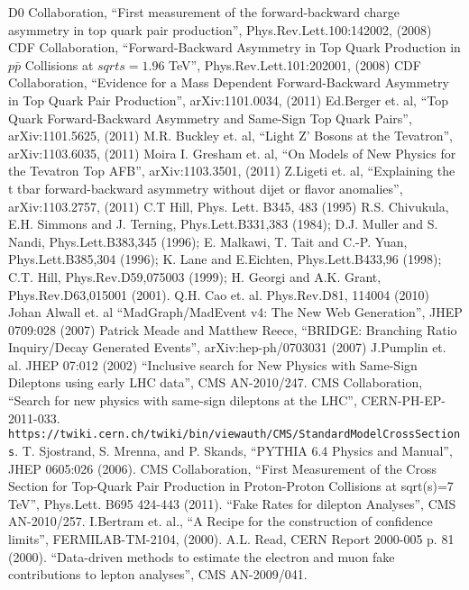 \begin{thebibliography}{99}

 {D0 Collaboration, ``First measurement of the forward-backward charge asymmetry in top quark pair production'', Phys.Rev.Lett.100:142002, (2008)}
 {CDF Collaboration, ``Forward-Backward Asymmetry in Top Quark Production in $p\bar{p}$ Collisions at $sqrt{s}=1.96$ TeV'', Phys.Rev.Lett.101:202001, (2008)}
 {CDF Collaboration, ``Evidence for a Mass Dependent Forward-Backward Asymmetry in Top Quark Pair Production'', arXiv:1101.0034, (2011)}
 {Ed.Berger et. al, ``Top Quark Forward-Backward Asymmetry and Same-Sign Top Quark Pairs'', arXiv:1101.5625, (2011)}
 {M.R. Buckley et. al, ``Light Z' Bosons at the Tevatron'', arXiv:1103.6035, (2011)}
 {Moira I. Gresham et. al, ``On Models of New Physics for the Tevatron Top AFB'', arXiv:1103.3501, (2011)}
 {Z.Ligeti et. al, ``Explaining the t tbar forward-backward asymmetry without dijet or flavor anomalies'', arXiv:1103.2757, (2011)}
 {C.T Hill, Phys. Lett. B345, 483 (1995)}
 {R.S. Chivukula, E.H. Simmons and J. Terning, Phys.Lett.B331,383 (1984); D.J. Muller and S. Nandi, Phys.Lett.B383,345 (1996); E. Malkawi, T. Tait 
and C.-P. Yuan, Phys.Lett.B385,304 (1996); K. Lane and E.Eichten, Phys.Lett.B433,96 (1998); C.T. Hill, Phys.Rev.D59,075003 (1999); H. Georgi and A.K. Grant, 
Phys.Rev.D63,015001 (2001).}
 {Q.H. Cao et. al. Phys.Rev.D81, 114004 (2010)}
 {Johan Alwall et. al ``MadGraph/MadEvent v4: The New Web Generation'', JHEP 0709:028 (2007)}
 {Patrick Meade and Matthew Reece, ``BRIDGE: Branching Ratio Inquiry/Decay Generated Events'', 	arXiv:hep-ph/0703031 (2007)}
 {J.Pumplin et. al. JHEP 07:012 (2002)}
 {``Inclusive search for New Physics with Same-Sign Dileptons using early LHC data''}, CMS AN-2010/247.
 {CMS Collaboration, ``Search for new physics with same-sign dileptons at the LHC''}, CERN-PH-EP-2011-033.
 {\tt https://twiki.cern.ch/twiki/bin/viewauth/CMS/StandardModelCrossSections}.
 {T. Sjostrand, S. Mrenna, and P. Skands, ``PYTHIA 6.4 Physics and Manual'', JHEP 0605:026 (2006)}.
 {CMS Collaboration, ``First Measurement of the Cross Section for Top-Quark Pair Production in Proton-Proton Collisions at 
sqrt(s)=7 TeV'', Phys.Lett. B695 424-443 (2011)}.
 {``Fake Rates for dilepton Analyses''}, CMS AN-2010/257.
 {I.Bertram et. al., ``A Recipe for the construction of confidence limits'', FERMILAB-TM-2104, (2000).}
 {A.L. Read, CERN Report 2000-005 p. 81 (2000).}
 {``Data-driven methods to estimate the electron and muon fake contributions to lepton analyses''}, CMS AN-2009/041.

\end{thebibliography}
